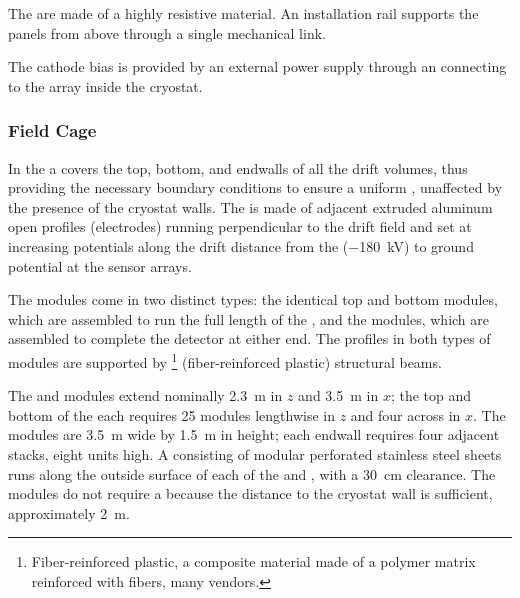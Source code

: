 The  are made of a highly resistive material. %
An  installation rail supports the  panels from above through a single mechanical link. %

The cathode bias is provided by an external  power supply through an  \fdth connecting to the  array %
inside the cryostat. 
 
\subsubsection{Field Cage}
\label{sec:fdsp-hv-des-fc}

In the  a  covers the top, bottom, and endwalls of all the drift volumes, thus providing the necessary
boundary conditions to ensure a uniform \efield, unaffected by the presence of the cryostat walls. %
The  is made of adjacent extruded aluminum open profiles (electrodes) running perpendicular to the drift field and set at increasing potentials along the \spmaxdrift drift distance from the   (\SI{-180}{kV}) to ground potential at the  sensor arrays. %

The  modules come in two distinct types: the identical top and bottom modules, which are assembled to run the full length of the , and the  modules, 
which are assembled to complete the detector at either end. %
The profiles in both types of modules are supported by \footnote{Fiber-reinforced plastic, a composite material made of a polymer matrix reinforced with fibers, many vendors.} (fiber-reinforced plastic) structural beams.  

The  and  modules extend nominally  \SI{2.3}{\meter} in $z$ and \SI{3.5}{\meter} in $x$; the top and bottom of the  each requires 25 modules lengthwise in $z$ and four across in $x$.  The  modules are \SI{3.5}{\meter} wide by \SI{1.5}{\meter} in height; each endwall requires four adjacent stacks, eight units high. A  consisting of modular %
perforated stainless steel sheets %
runs along the outside surface of each of the %
 and , with a \SI{30}{\centi\meter} clearance. The  modules do not require a  because the distance to the cryostat wall is sufficient, approximately \SI{2}{\meter}.

